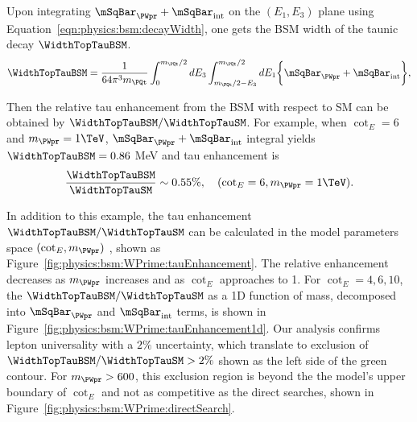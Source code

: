 Upon integrating  $\mSqBar _{\PWpr} +  \mSqBar _{\mathrm{int}}$ on the $(E_1,E_3)$ plane using Equation~\ref{eqn:physics:bsm:decayWidth}, one gets the BSM width of the taunic decay $\WidthTopTauBSM$. 
\begin{equation}
	\WidthTopTauBSM = \frac{1}{64 \pi^3 m_\PQt} \int_{0}^{m_\PQt/2} dE_3 \int_{m_\PQt/2-E_3}^{m_\PQt/2} dE_1  \bigg\{ \mSqBar _{\PWpr} +  \mSqBar_{\mathrm{int}}  \bigg \},
\end{equation}


\noindent Then the relative tau enhancement from the BSM with respect to SM can be obtained by $\WidthTopTauBSM/ \WidthTopTauSM$. For example, when $\cot_E=6$  and $m_{\PWpr}=1\TeV$, $\mSqBar _{\PWpr} +  \mSqBar _{\mathrm{int}}$ integral yields $\WidthTopTauBSM = 0.86 $ MeV and tau enhancement is
\begin{equation}
	\frac{ \WidthTopTauBSM}{ \WidthTopTauSM} \sim 0.55 \%, \quad (\cot_E=6, m_{\PWpr}=1 \text{\TeV}).
\end{equation}

\noindent In addition to this example, the tau enhancement $\WidthTopTauBSM/  \WidthTopTauSM $ can be calculated in the model parameters space $(\cot_E, m_{\PWpr})$ , shown as Figure~\ref{fig:physics:bsm:WPrime:tauEnhancement}. The relative enhancement decreases as $m_{\PWpr}$ increases and as $\cot_E$ approaches to 1. For $\cot_E=4,6,10$, the $\WidthTopTauBSM/  \WidthTopTauSM $ as a 1D function of \PWpr mass, decomposed into $\mSqBar _{\PWpr} $ and $\mSqBar _{\mathrm{int}}$  terms, is shown in Figure~\ref{fig:physics:bsm:WPrime:tauEnhancement1d}. Our analysis confirms lepton universality with a $2\%$ uncertainty, which translate to exclusion of $ \WidthTopTauBSM/  \WidthTopTauSM  >  2\%$ shown as the left side of the green contour. For $m_{\PWpr}>600$\GeV, this exclusion region is beyond the the model's upper boundary of $\cot_E$ and not as competitive as the direct searches, shown in Figure~\ref{fig:physics:bsm:WPrime:directSearch}.




